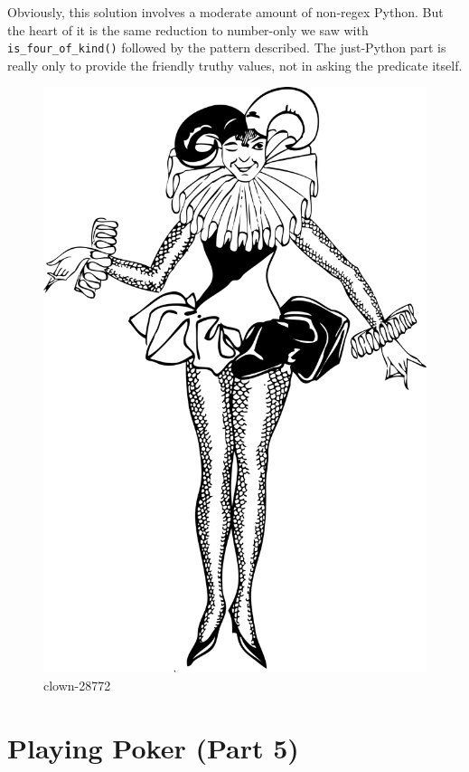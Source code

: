 Obviously, this solution involves a moderate amount of non-regex Python.
But the heart of it is the same reduction to number-only we saw with
\texttt{is\_four\_of\_kind()} followed by the pattern described. The
just-Python part is really only to provide the friendly truthy values,
not in asking the predicate itself.

\begin{figure}
\centering
\includegraphics{images/clown-28772.svg}
\caption{clown-28772}
\end{figure}

\newpage

\hypertarget{playing-poker-part-5}{%
\section{Playing Poker (Part 5)}\label{playing-poker-part-5}}

